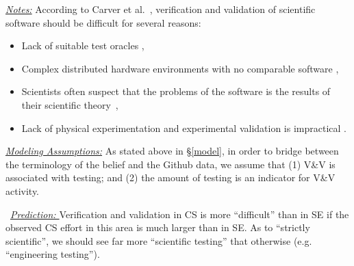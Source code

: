 \documentclass[sigconf,review,anonymous]{acmart}
\newcommand{\bi}{\begin{itemize}}
\newcommand{\ei}{\end{itemize}}
\begin{document}
\noindent \textit{\underline{Notes:}} 
According to Carver et al.~\cite{carver07_environment},
verification and validation of scientific software should be difficult for several reasons:
\bi
  \item Lack of suitable test oracles \cite{kanewala13_testing},
  \item Complex distributed hardware environments with no comparable software \cite{basili08_hpc},
  \item Scientists often suspect that the problems of the software is the results of their scientific theory~\cite{faulk09_secs},
  \item Lack of physical experimentation and experimental validation is impractical \cite{carver07_environment}. 
\ei



\noindent\textit{\underline{Modeling Assumptions:}} 
As stated above in \S\ref{model},
in order to bridge between the terminology of the belief and the Github data, we assume that (1) V\&V is associated with testing; and (2) the amount of testing is an indicator for V\&V activity.

\noindent ~\textit{\underline{Prediction: }}
Verification and validation in CS is more
``difficult'' than in SE if the observed CS effort in this area
is much larger than in SE. As to ``strictly scientific'', we should see far more ``scientific
testing'' that otherwise (e.g. ``engineering testing''). 
\end{document}
